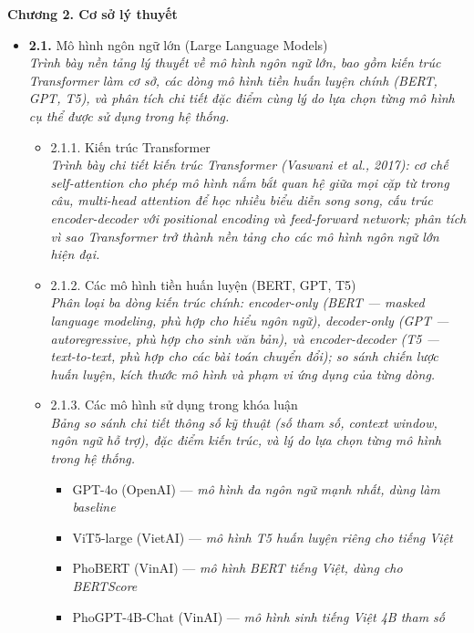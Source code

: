 \documentclass[a4paper,12pt]{article}
\begin{document}
\vspace{0.5cm}

{\fontsize{13pt}{15pt}\selectfont\bfseries Chương 2. Cơ sở lý thuyết}

\begin{itemize}[leftmargin=1cm, labelsep=0.3cm, itemsep=1pt, label={}]
  \item \textbf{2.1.} Mô hình ngôn ngữ lớn (Large Language Models) \\
  {\small\itshape Trình bày nền tảng lý thuyết về mô hình ngôn ngữ lớn, bao gồm kiến trúc Transformer làm cơ sở, các dòng mô hình tiền huấn luyện chính (BERT, GPT, T5), và phân tích chi tiết đặc điểm cùng lý do lựa chọn từng mô hình cụ thể được sử dụng trong hệ thống.}
  \begin{itemize}[leftmargin=1cm, itemsep=0pt, label={}]
    \item 2.1.1. Kiến trúc Transformer \\
      {\small\itshape Trình bày chi tiết kiến trúc Transformer (Vaswani et al., 2017): cơ chế self-attention cho phép mô hình nắm bắt quan hệ giữa mọi cặp từ trong câu, multi-head attention để học nhiều biểu diễn song song, cấu trúc encoder-decoder với positional encoding và feed-forward network; phân tích vì sao Transformer trở thành nền tảng cho các mô hình ngôn ngữ lớn hiện đại.}
    \item 2.1.2. Các mô hình tiền huấn luyện (BERT, GPT, T5) \\
      {\small\itshape Phân loại ba dòng kiến trúc chính: encoder-only (BERT --- masked language modeling, phù hợp cho hiểu ngôn ngữ), decoder-only (GPT --- autoregressive, phù hợp cho sinh văn bản), và encoder-decoder (T5 --- text-to-text, phù hợp cho các bài toán chuyển đổi); so sánh chiến lược huấn luyện, kích thước mô hình và phạm vi ứng dụng của từng dòng.}
    \item 2.1.3. Các mô hình sử dụng trong khóa luận \\
      {\small\itshape Bảng so sánh chi tiết thông số kỹ thuật (số tham số, context window, ngôn ngữ hỗ trợ), đặc điểm kiến trúc, và lý do lựa chọn từng mô hình trong hệ thống.}
    \begin{itemize}[leftmargin=1cm, itemsep=0pt, label={--}]
      \item GPT-4o (OpenAI) — {\small\itshape mô hình đa ngôn ngữ mạnh nhất, dùng làm baseline}
      \item ViT5-large (VietAI) — {\small\itshape mô hình T5 huấn luyện riêng cho tiếng Việt}
      \item PhoBERT (VinAI) — {\small\itshape mô hình BERT tiếng Việt, dùng cho BERTScore}
      \item PhoGPT-4B-Chat (VinAI) — {\small\itshape mô hình sinh tiếng Việt 4B tham số}
    \end{itemize}
  \end{itemize}


\end{itemize}
\end{document}
